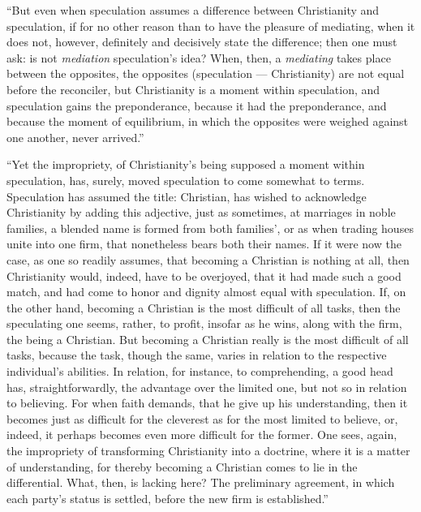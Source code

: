 \documentclass[12pt]{book}
\begin{document}
``But even when speculation assumes a difference between Christianity and speculation, if for no other reason than to have the pleasure of mediating, when it does not, however, definitely and decisively state the difference; then one must ask: is not \emph{mediation} speculation's idea? When, then, a \emph{mediating} takes place between the opposites, the opposites (speculation --- Christianity) are not equal before the reconciler, but Christianity is a moment within speculation, and speculation gains the preponderance, because it had the preponderance, and because the moment of equilibrium, in which the opposites were weighed against one another, never arrived.''

``Yet the impropriety, of Christianity's being supposed a moment within speculation, has, surely, moved speculation to come somewhat to terms. Speculation has assumed the title: Christian, has wished to acknowledge Christianity by adding this adjective, just as sometimes, at marriages in noble families, a blended name is formed from both families', or as when trading houses unite into one firm, that nonetheless bears both their names. If it were now the case, as one so readily assumes, that becoming a Christian is nothing at all, then Christianity would, indeed, have to be overjoyed, that it had made such a good match, and had come to honor and dignity almost equal with speculation. If, on the other hand, becoming a Christian is
the most difficult of all tasks, then the speculating one seems, rather, to profit, insofar as he wins, along with the firm, the being a Christian. But becoming a Christian really is the most difficult of all tasks, because the task, though the same, varies in relation to the respective individual's abilities. In relation, for instance, to comprehending, a good head has, straightforwardly, the advantage over the limited one, but not so in relation to believing. For when faith demands, that he give up his understanding, then it becomes just as difficult for the cleverest as for the most limited to believe, or, indeed, it perhaps becomes even more difficult for the former. One sees, again, the impropriety of transforming Christianity into a doctrine, where it is a matter of understanding, for thereby becoming a Christian comes to lie in the differential. What, then, is lacking here? The preliminary agreement, in which each party's status is settled, before the new firm is established.''
\end{document}
